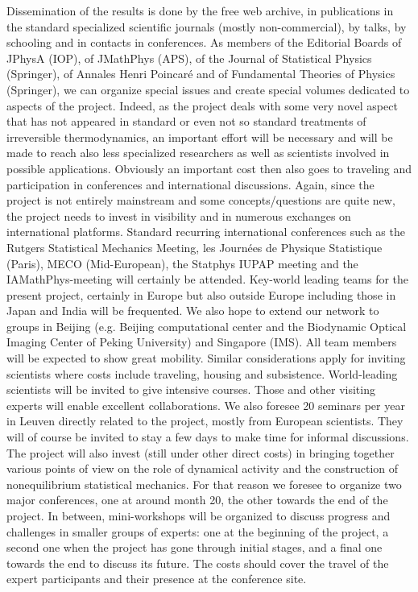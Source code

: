 Dissemination of the results is done by the free web archive, in publications in the standard specialized scientific journals (mostly non-commercial), by talks, by schooling and in contacts in conferences. As members of the Editorial Boards of JPhysA (IOP), of JMathPhys (APS), of the Journal of Statistical Physics (Springer), of Annales Henri Poincar\'e and of Fundamental Theories of Physics (Springer), we can organize special issues and create special volumes dedicated to aspects of the project. Indeed, as the project deals with some very novel aspect that has not appeared in standard or even not so standard treatments of irreversible thermodynamics, an important effort will be necessary and will be made to reach also less specialized researchers as well as scientists involved in possible applications.
Obviously an important cost then also goes to traveling and participation in conferences and international discussions. Again, since the project is not entirely mainstream and some concepts/questions are quite new, the project needs to invest in visibility and in numerous exchanges on international platforms. Standard recurring international conferences such as the Rutgers Statistical Mechanics Meeting, les Journ\'ees de Physique Statistique (Paris), MECO (Mid-European), the Statphys IUPAP meeting and the IAMathPhys-meeting will certainly be attended.  Key-world leading teams for the present project, certainly in Europe but also outside Europe including those in Japan and India will be frequented. We also hope to extend our network to groups in Beijing (e.g. Beijing computational center and the Biodynamic Optical Imaging Center of Peking University) and Singapore (IMS).  All team members will be expected to show great mobility.  Similar considerations apply for inviting scientists where costs include traveling, housing and subsistence. World-leading scientists will be invited to give intensive courses.  Those and other visiting experts will enable excellent collaborations.  We also foresee 20 seminars per year in Leuven directly related to the project, mostly from European scientists. They will of course be invited to stay a few days to make time for informal discussions. The project will also invest (still under other direct costs) in bringing together various points of view on the role of dynamical activity and the construction of nonequilibrium statistical mechanics. For that reason we foresee to organize two major conferences, one at around month 20, the other towards the end of the project.  In between, mini-workshops will be organized to discuss progress and challenges in smaller groups of experts: one at the beginning of the project, a second one when the project has gone through initial stages, and a final one towards the end to discuss its future. The costs should cover the travel of the expert participants and their presence at the conference site.


